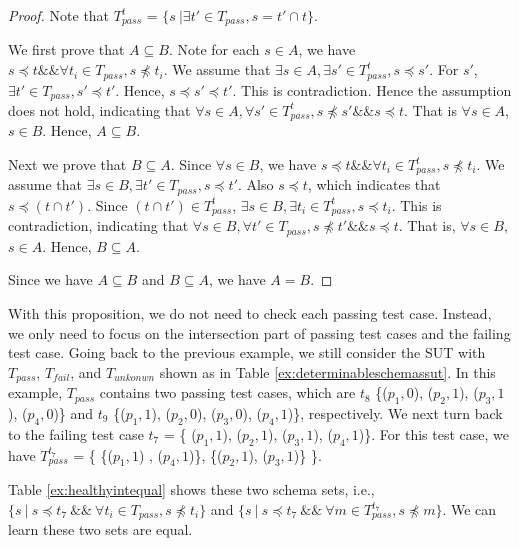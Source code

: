 \begin{proof}
Note that $T_{pass}^{t}$ = $\{ s\ |\exists t' \in T_{pass}, s =  t' \cap t \}$.

We first prove that $A \subseteq B$. Note for each $s \in A$, we have $s \preceq t \&\& \forall t_{i} \in T_{pass}, s \npreceq t_{i}$. We assume that $\exists s \in A, \exists s' \in T_{pass}^{t}, s \preceq s'$. For $s'$, $\exists t' \in T_{pass}, s' \preceq t'$. Hence, $s  \preceq s' \preceq t'$. This is contradiction. Hence the assumption does not hold, indicating that $\forall s \in A, \forall s' \in T_{pass}^{t}, s \npreceq s' \&\& s \preceq t$. That is $\forall s \in A$, $s \in B$. Hence, $A \subseteq B$.

Next we prove that $B \subseteq A$. Since $\forall s \in B$, we have $s \preceq t \&\& \forall t_{i} \in  T_{pass}^{t}, s \npreceq t_{i}$. We assume that $\exists s \in B, \exists t' \in T_{pass}, s \preceq t'$. Also $s \preceq t$, which indicates that $s \preceq (t \cap t')$.  Since $(t \cap t') \in T_{pass}^{t} $, $\exists s \in B, \exists t_{i} \in T_{pass}^{t}, s \preceq t_{i}$. This is contradiction, indicating that  $\forall s \in B, \forall t' \in T_{pass}, s \npreceq t' \&\& s \preceq t$. That is, $\forall s \in B$, $s \in A$. Hence, $B \subseteq A$.

Since we have $A \subseteq B$ and $B \subseteq A$, we have $A = B$.
\end{proof}

With this proposition, we do not need to check each passing test case. Instead, we only need to focus on the intersection part of passing test cases and the failing test case.  Going back to the previous example,  we still consider the SUT with $T_{pass}$, $T_{fail}$, and $T_{unkonwn}$ shown as in Table \ref{ex:determinableschemassut}. In this example, $T_{pass}$ contains two passing test cases, which are  $t_{8}$ \{($p_{1}, 0$), ($p_{2}, 1$), ($p_{3}, 1$), ($p_{4}, 0$)\} and  $t_{9}$  \{($p_{1}, 1$), ($p_{2}, 0$), ($p_{3}, 0$), ($p_{4}, 1$)\}, respectively. We next turn back to the failing test case $t_{7}$ =  \{ ($p_{1}, 1$), ($p_{2}, 1$), ($p_{3}, 1$), ($p_{4}, 1$)\}. For this test case, we have $T_{pass}^{t_{7}}$ = \{ \{($p_{1}, 1$) , ($p_{4}, 1$)\}, \{($p_{2}, 1$), ($p_{3}, 1$)\} \}.


Table \ref{ex:healthyintequal} shows these two schema sets, i.e., $\{ s\ |\ s \preceq t_{7}\ \&\&\  \forall t_{i} \in T_{pass}, s \npreceq t_{i} \} $ and $\{ s\ |\ s \preceq t_{7}\ \&\&\ \forall m \in T_{pass}^{t_{7}}, s \npreceq m \}$. We can learn these two sets are equal.

